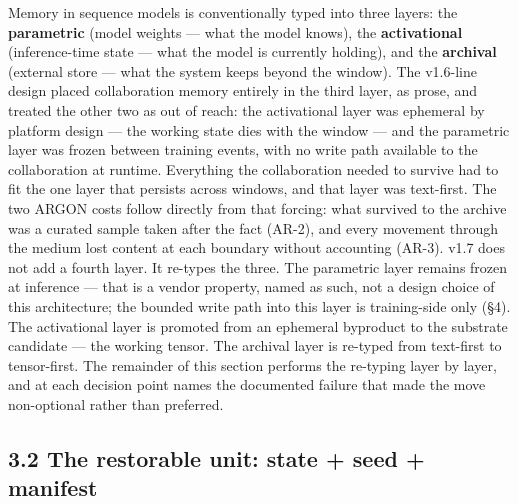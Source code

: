 \documentclass[11pt]{article}
\begin{document}
Memory in sequence models is conventionally typed into three layers: the \textbf{parametric} (model weights --- what the model knows), the \textbf{activational} (inference-time state --- what the model is currently holding), and the \textbf{archival} (external store --- what the system keeps beyond the window). The v1.6-line design placed collaboration memory entirely in the third layer, as prose, and treated the other two as out of reach: the activational layer was ephemeral by platform design --- the working state dies with the window --- and the parametric layer was frozen between training events, with no write path available to the collaboration at runtime. Everything the collaboration needed to survive had to fit the one layer that persists across windows, and that layer was text-first. The two ARGON costs follow directly from that forcing: what survived to the archive was a curated sample taken after the fact (AR-2), and every movement through the medium lost content at each boundary without accounting (AR-3). v1.7 does not add a fourth layer. It re-types the three. The parametric layer remains frozen at inference --- that is a vendor property, named as such, not a design choice of this architecture; the bounded write path into this layer is training-side only (\S{}4). The activational layer is promoted from an ephemeral byproduct to the substrate candidate --- the working tensor. The archival layer is re-typed from text-first to tensor-first. The remainder of this section performs the re-typing layer by layer, and at each decision point names the documented failure that made the move non-optional rather than preferred.

\subsection{3.2 The restorable unit: state + seed + manifest}\label{the-restorable-unit-state-seed-manifest}
\end{document}
